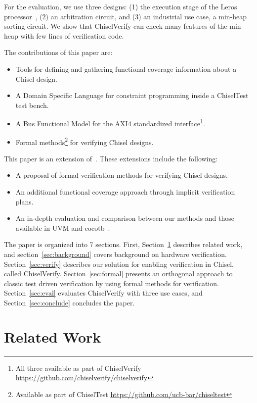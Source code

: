 \documentclass[conference]{IEEEtran}
\newcommand{\todo}[1]{{\color{olive} TODO: #1}}
\begin{document}
For the evaluation, we use three designs: (1) the execution stage of the Leros processor~\cite{leros:arcs2019}, (2) an arbitration circuit, and (3) an industrial use case, a min-heap sorting circuit.
We show that ChiselVerify can check many features of the min-heap with few lines of 
verification code.

The contributions of this paper are:
\begin{itemize}
	\item Tools for defining and gathering functional coverage information about a Chisel design.
	\item A Domain Specific Language for constraint programming inside a ChiselTest test bench.
	\item A Bus Functional Model for the AXI4 standardized interface\footnote{All three available as part of ChiselVerify \url{https://github.com/chiselverify/chiselverify}}.
	\item Formal methods\footnote{Available as part of ChiselTest \url{https://github.com/ucb-bar/chiseltest}} for verifying Chisel designs.
\end{itemize}

This paper is an extension of~\cite{ChiselVerify:2021}.
These extensions include the following:

\begin{itemize}
	\item A proposal of formal verification methods for verifying Chisel designs.
	\item An additional functional coverage approach through implicit verification plans.
	\item An in-depth evaluation and comparison between our methods and those available in UVM and cocotb~\cite{cocotb:2018}.
\end{itemize}

The paper is organized into 7 sections.
First, Section~\ref{sec:related} describes related work, and section~\ref{sec:background} covers 
background on hardware verification. 
Section~\ref{sec:verify} describes our solution for enabling verification in Chisel, called ChiselVerify.
Section~\ref{sec:formal} presents an orthogonal approach to classic test driven verification by using formal
methods for verification. 
Section~\ref{sec:eval} evaluates ChiselVerify with three use cases, and Section~\ref{sec:conclude} concludes the paper.


\section{Related Work}
\label{sec:related}
\end{document}
